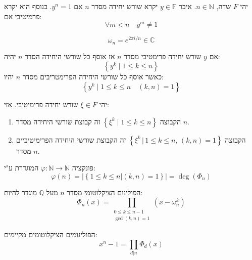 \documentclass{tstextbook}
\begin{document}
\begin{definition}
יהי \(F\) שדה, \(n \in \mathbb{N}\). איבר \(y \in \mathbb{F}\) יקרא שורש יחידה מסדר \(n\) אם \(y^n=1\).
בנוסף הוא יקרא פרמיטיבי אם:
$$\forall m < n\quad y^m\neq 1$$

\end{definition}
\begin{example}
$$\omega_{n}=e^{ 2\pi i/n }\in \mathbb{C}$$

\end{example}
\begin{lemma}
אם \(y\) שורש יחידה פרימטיבי מסדר \(n\) אז אוסף כל שורשי היחידה הסדר \(n\) יהיה:
$$\left\{  y^{k}\mid {1}\leq k\leq n  \right\}$$
כאשר אוסף כל שורשי היחידה הפרימטריבים מסדר \(n\) יהיו:
$$\left\{  y^k \mid 1\leq k\leq n\quad (k,n)=1 \right\}$$

\end{lemma}
\begin{proposition}
יהי \(\xi \in F\) שורש יחידה פרימיטיבי. אזי:

  \begin{enumerate}
    \item הקבוצה \(\left\{\xi^{k}\mid1\leq k\leq n\right\}\) זה קבוצת שורשי היחידה מסדר \(n\). 


    \item הקבוצה \(\left\{\xi^{k}\,|\,1\leq k\leq n,\,(k,n)=1\right\}\) זה הקבוצת שורשי היחידה הפרימיטיביים מסדר \(n\). 


  \end{enumerate}
\end{proposition}
\begin{definition}
פונקציה \(\varphi:\mathbb{N}\to\mathbb{N}\) המוגדרת ע"י:
$$\varphi\left(n\right)=\left|\left\{1\leq k\leq n\left|\left(k,n\right)=1\right\}\right|=\deg\left(\Phi_{n}\right)\right.$$

\end{definition}
\begin{definition}
הפולינום הציקלוטומי מסדר \(n\) מעל \(\mathbb{Q}\) מוגדר להיות:
$$\Phi_{n}(x)=\prod_{\begin{array}{l}{0\leq k\leq n-1}\\ {\operatorname*{gcd}(k,n)=1}\end{array}}\left(x-\omega_{n}^{k}\right)$$

\end{definition}
הפולינומים הציקלוטומים מקיימים:
$$x^{n}-1=\prod_{d|n}\Phi_{d}\left(x\right)$$
\end{document}
